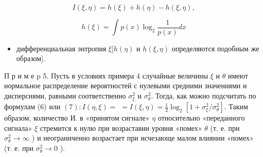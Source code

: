 \documentclass[10pt]{article}
\begin{document}
\[

I(\xi, \eta)=h(\xi)+h(\eta)-h(\xi, \eta),

\]



\[

h(\xi)=\int p(x) \log _{2} \frac{1}{p(x)} d x

\]



\begin{itemize}

  \item дифференциальная энтропия $\xi[h(\eta)$ и $h(\xi, \eta)$ определяются подобным же образом].

\end{itemize}



П р и м е $\mathrm{p}$ 5. Пусть в условиях примера 4 случайные величины $\xi$ и $\theta$ имеют нормальное распределение вероятностей с нулевыми средними значениями и дисперсиями, равными соответственно $\sigma_{\xi}^{2}$ и $\sigma_{\theta}^{2}$. Тогда, как можно подсчитать по формулам (6) или $(7): I(\eta, \xi)=$ $=I(\xi, \eta)=\frac{1}{2} \log _{2}\left[1+\sigma_{\xi}^{2} / \sigma_{\theta}^{2}\right]$. Таким образом, количество И. в «принятом сигнале» $\eta$ относительно «переданного сигнала» $\xi$ стремится к нулю при возраставии уровня «помех» $\theta$ (т. е. при $\sigma_{\theta}^{2} \rightarrow \infty$ ) и неограниченно возрастает при исчезающе малом влиянии «помех» (т. е. при $\sigma_{\theta}^{2} \rightarrow 0$ ).
\end{document}

